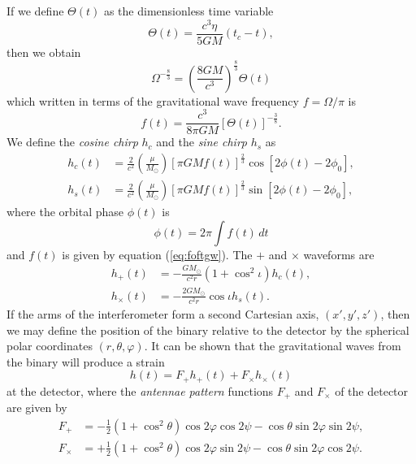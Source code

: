 If we define $\Theta(t)$ as the dimensionless time variable
\begin{equation}
\Theta(t) = \frac{c^3\eta}{5GM}(t_c - t),
\label{eq:thetadef}
\end{equation}
then we obtain
\begin{equation}
\Omega^{-\frac{8}{3}} = \left(\frac{8GM}{c^3}\right)^\frac{8}{3}
\Theta(t)
\end{equation}
which written in terms of the gravitational wave frequency $f = \Omega / \pi$
is
\begin{equation}
f(t) = \frac{c^3}{8\pi GM} \left[\Theta(t)\right]^{-\frac{3}{8}}.
\label{eq:foftgw}
\end{equation}
We define the \emph{cosine chirp} $h_c$  and the \emph{sine chirp} $h_s$ as 
\begin{align}
\label{eq:coschirp}
h_c(t) & = \frac{2}{c^2}\left(\frac{\mu}{M_\odot}\right) 
\left[\pi G M f(t)\right]^{\frac{2}{3}} 
\cos\left[2 \phi(t)  - 2\phi_0\right], \\
h_s(t) & = \frac{2}{c^2}\left(\frac{\mu}{M_\odot}\right) 
\left[\pi G M f(t)\right]^{\frac{2}{3}} 
\sin\left[2\phi(t) - 2\phi_0\right],
\label{eq:sinechirp}
\end{align}
where the orbital phase $\phi(t)$ is
\begin{equation}
\phi(t) = 2\pi \int f(t) \, dt
\end{equation}
and $f(t)$ is given by equation (\ref{eq:foftgw}). 
The $+$ and $\times$ waveforms are
\begin{align}
\label{eq:hpluswave}
h_+(t) &= - \frac{GM_\odot}{c^2 r} (1 + \cos^2\iota) h_c(t), \\
h_\times(t) &= - \frac{2GM_\odot}{c^2 r} \cos\iota h_s(t).
\end{align}
If the arms of the interferometer form a second Cartesian axis, $(x',y',z')$,
then we may define the position of the binary relative to the detector by the
spherical polar coordinates $(r,\theta,\varphi)$. It can be shown that the
gravitational waves from the binary will produce a
strain\cite{1987MNRAS.224..131S}
\begin{equation}
h(t) = F_+ h_+(t) + F_\times h_\times(t)
\end{equation}
at the detector, where the \emph{antennae pattern} functions $F_+$ and
$F_\times$ of the detector are given by
\begin{align}
F_+ &= -\frac{1}{2}(1 + \cos^2\theta) \cos 2\varphi \cos 2 \psi - 
\cos\theta \sin 2\varphi \sin 2\psi, \\
F_\times &= +\frac{1}{2}( 1 + \cos^2 \theta) \cos 2\varphi \sin 2\psi -
\cos\theta \sin 2\varphi \cos 2 \psi.
\label{eq:ftimesfunc}
\end{align}
